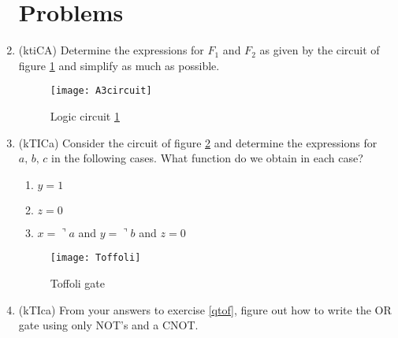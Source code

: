 \documentclass{article}
\begin{document}
\begin{enumerate}
\section{Problems}
\item (ktiCA) Determine the expressions for $F_1$ and $F_2$ as given by the circuit of figure \ref{circuit} and simplify as much as possible.
	\begin{figure}[h]
	\begin{center}
		\texttt{[image: A3circuit]}
		\caption{Logic circuit \ref{circuit}}
		\label{circuit}
	\end{center}
	\end{figure}
\item\label{qtof} (kTICa) Consider the circuit of figure \ref{toffoli} and determine the expressions for $a,\,b,\,c$ in the following cases. What function do we obtain in each case?
	\begin{enumerate}
		\item $y=1$
		\item $z=0$
		\item $x=\urcorner a$ and $y=\urcorner b$ and $z=0$
	\end{enumerate}
	\begin{figure}[h]
	\begin{center}
		\texttt{[image: Toffoli]}
		\caption{Toffoli gate}
		\label{toffoli}
	\end{center}
	\end{figure}
\item (kTIca) From your answers to exercise \ref{qtof}, figure out how to write the OR gate using only NOT's and a CNOT.
\end{enumerate}
\end{document}
